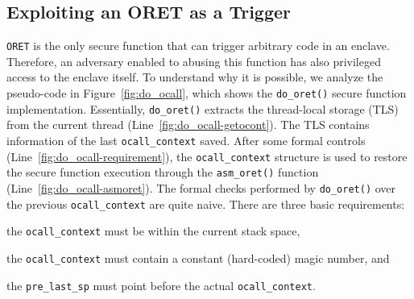 \subsection{Exploiting an ORET as a Trigger}
\label{ssec:oret-trigger}

\texttt{ORET} is the only secure function that can trigger arbitrary code in an 
enclave. 
Therefore, an adversary enabled to abusing this function has also
privileged access to the enclave itself.
To understand why it is possible, we analyze the pseudo-code in 
Figure~\ref{fig:do_ocall}, which shows the \texttt{do\_oret()} secure function 
implementation.
Essentially, \texttt{do\_oret()} extracts the thread-local storage (TLS) from 
the current thread (Line~\ref{fig:do_ocall-getocont}).
The TLS contains information of the last \texttt{ocall\_context} saved.
After some formal controls (Line~\ref{fig:do_ocall-requirement}), the 
\texttt{ocall\_context} structure is used to restore the secure function 
execution through the \texttt{asm\_oret()} function 
(Line~\ref{fig:do_ocall-asmoret}).
The formal checks performed by \texttt{do\_oret()} over the previous 
\texttt{ocall\_context} are quite naive.
There are three basic requirements:
\begin{enumerate*}[label=(\roman*)]
	\item the \texttt{ocall\_context} must be within the current stack space,
	\item the \texttt{ocall\_context} must contain a constant (hard-coded) 
	magic number, and
	\item the \texttt{pre\_last\_sp} must point before the actual 
	\texttt{ocall\_context}.
\end{enumerate*}

